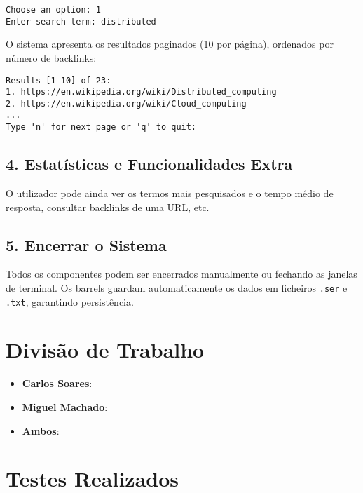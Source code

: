 \documentclass{article}
\begin{document}
\begin{lstlisting}
Choose an option: 1
Enter search term: distributed
\end{lstlisting}

O sistema apresenta os resultados paginados (10 por página), ordenados por número de backlinks:

\begin{lstlisting}
Results [1–10] of 23:
1. https://en.wikipedia.org/wiki/Distributed_computing
2. https://en.wikipedia.org/wiki/Cloud_computing
...
Type 'n' for next page or 'q' to quit:
\end{lstlisting}

\subsection*{4. Estatísticas e Funcionalidades Extra}

O utilizador pode ainda ver os termos mais pesquisados e o tempo médio de resposta, consultar backlinks de uma URL, etc.

\subsection*{5. Encerrar o Sistema}

Todos os componentes podem ser encerrados manualmente ou fechando as janelas de terminal. Os barrels guardam automaticamente os dados em ficheiros \texttt{.ser} e \texttt{.txt}, garantindo persistência.













\newpage
\section{Divisão de Trabalho}
\begin{itemize}
    \item \textbf{Carlos Soares}: 
    \item \textbf{Miguel Machado}: 
    \item \textbf{Ambos}: 
\end{itemize}






\newpage
\section{Testes Realizados}
\end{document}
